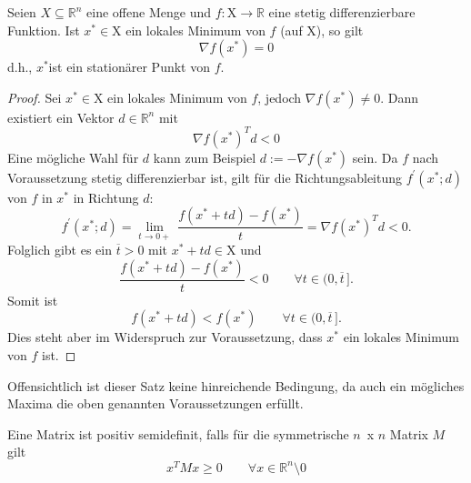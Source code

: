 \documentclass[a4paper,10pt]{scrartcl}
\begin{document}
\begin{satz}
	Seien $ X \subseteq \mathbb{R}^n $ eine offene Menge und $ f:\mathrm{X} \longrightarrow \mathbb{R} $ eine stetig differenzierbare Funktion. Ist  $ x^{*} \in \mathrm{X} $ ein lokales Minimum von $f$ (auf $ \mathrm{X} $), so gilt 
	\begin{equation*}
	\nabla f(x^*) = 0 
	\end{equation*}
	d.h., $x^{*}$ist ein stationärer Punkt von $f$. 
\end{satz}
\begin{proof}
	Sei $ x^{*} \in \mathrm{X} $ ein lokales Minimum von $f$, jedoch $\nabla f(x^*) \ne 0 $. Dann existiert ein Vektor $d \in \mathbb{R}^{n} $ mit 
	\begin{equation*}
	\nabla f(x^*)^{T}d < 0
	\end{equation*}
	Eine mögliche Wahl für $d$ kann zum Beispiel $d := -\nabla f(x^*)$ sein. Da $f$ nach Voraussetzung stetig differenzierbar ist, gilt für die Richtungsableitung $f^{'}(x^{*};d)$ von $f$ in $ x^{*}$ in Richtung $d$: 
	\begin{equation*}
	f^{'}(x^{*};d) = \lim_{t \to 0+}\ \dfrac{f(x^{*} + td) - f(x^{*})}{t} = \nabla f(x^{*})^{T}d < 0. 
	\end{equation*}
	Folglich gibt es ein $\overline{t} >0 $ mit $ x^{*} +td \in \mathrm{X}$ und 
	\begin{equation*}
	\dfrac{f(x^{*}+td) - f(x^{*})}{t}<0 \qquad \forall t \in (0,\overline{t} \,] .
	\end{equation*}
	Somit ist 
	\begin{equation*}
	f(x^{*}+td)<f(x^{*}) \qquad \forall t \in (0,\overline{t} \,] .
	\end{equation*}
	Dies steht aber im Widerspruch zur Voraussetzung, dass $x^{*}$ ein lokales Minimum von $f$ ist.
\end{proof}

\begin{bemerkung}
	Offensichtlich ist dieser Satz keine hinreichende Bedingung, da auch ein mögliches Maxima die oben genannten Voraussetzungen erfüllt.
\end{bemerkung}

\begin{erinnerung}
	Eine Matrix ist positiv semidefinit, falls für die symmetrische $ n \,$ x $n$ Matrix $M$ gilt 
	\begin{equation}
	x^{T}Mx \ge 0 \qquad \forall x \in \mathbb{R}^{n} \setminus 0
	\label{definit}
	\end{equation}
\end{erinnerung}
\end{document}
